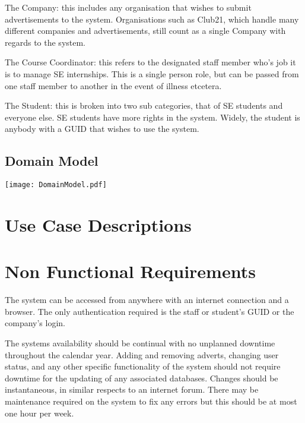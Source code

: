 \documentclass{l3deliverable}
\begin{document}
The Company: this includes any organisation that wishes to submit 
advertisements to the system. Organisations such as Club21, which handle
many different companies and advertisements, still count as a single Company
with regards to the system.

The Course Coordinator: this refers to the designated staff member who's job
it is to manage SE internships. This is a single person role, but can be 
passed from one staff member to another in the event of illness etcetera.

The Student: this is broken into two sub categories, that of SE students and
everyone else. SE students have more rights in the system. Widely, the student
is anybody with a GUID that wishes to use the system.


\subsection{Domain Model}


\texttt{[image: DomainModel.pdf]}


\section{Use Case Descriptions}



\section{Non Functional Requirements}

The system can be accessed from anywhere with an internet connection and a
browser. The only authentication required is the staff or student's GUID or 
the company's login.

The systems availability should be continual with no unplanned downtime
throughout the calendar year. Adding and removing adverts, changing user status,
and any other specific functionality of the system should not require downtime
for the updating of any associated databases. Changes should be instantaneous,
in similar respects to an internet forum. There may be maintenance required on
the system to fix any errors but this should be at most one hour per week.
\end{document}

